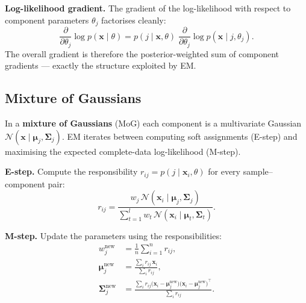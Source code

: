 \documentclass[11pt, oneside]{book}
\newcommand{\T}{^{\top}}
\begin{document}
\textbf{Log-likelihood gradient.}
The gradient of the log-likelihood with respect to component parameters
$\theta_j$ factorises cleanly:
\[
  \frac{\partial}{\partial\theta_j}\log p(\bm{x}\mid\theta)
  = p(j\mid\bm{x},\theta)\;\frac{\partial}{\partial\theta_j}\log p(\bm{x}\mid j,\theta_j).
\]
The overall gradient is therefore the posterior-weighted sum of component
gradients — exactly the structure exploited by EM.

\subsection{Mixture of Gaussians}

In a \textbf{mixture of Gaussians} (MoG) each component is a multivariate
Gaussian $\mathcal{N}(\bm{x}\mid\bm{\mu}_j,\bm{\Sigma}_j)$.
EM iterates between computing soft assignments (E-step) and maximising the
expected complete-data log-likelihood (M-step).

\textbf{E-step.}
Compute the responsibility $r_{ij} = p(j\mid\bm{x}_i,\theta)$ for every
sample–component pair:
\[
  r_{ij}
  = \frac{w_j\,\mathcal{N}(\bm{x}_i\mid\bm{\mu}_j,\bm{\Sigma}_j)}
         {\displaystyle\sum_{t=1}^{l} w_t\,\mathcal{N}(\bm{x}_i\mid\bm{\mu}_t,\bm{\Sigma}_t)}.
\]

\textbf{M-step.}
Update the parameters using the responsibilities:
\begin{align*}
  w_j^{\text{new}} &= \frac{1}{n}\sum_{i=1}^{n} r_{ij},\\[4pt]
  \bm{\mu}_j^{\text{new}} &= \frac{\displaystyle\sum_i r_{ij}\,\bm{x}_i}
                                  {\displaystyle\sum_i r_{ij}},\\[4pt]
  \bm{\Sigma}_j^{\text{new}} &= \frac{\displaystyle\sum_i r_{ij}
      \bigl(\bm{x}_i-\bm{\mu}_j^{\text{new}}\bigr)\bigl(\bm{x}_i-\bm{\mu}_j^{\text{new}}\bigr)\T}
                                     {\displaystyle\sum_i r_{ij}}.
\end{align*}
\end{document}
